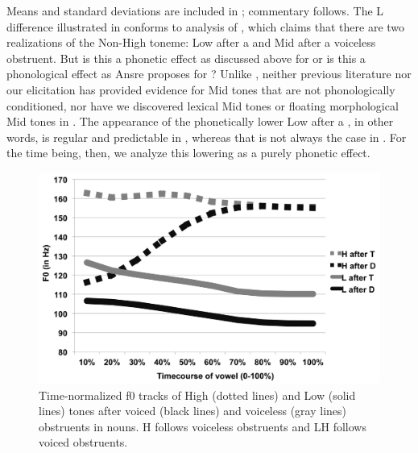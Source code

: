 \documentclass[output=paper,newtxmath,modfonts,nonflat,hidelinks]{langsci/langscibook}
\begin{document}
Means and standard deviations are included in ; commentary follows. The L  difference illustrated in  conforms to  analysis of , which claims that there are two realizations of the Non-High toneme: Low after a  and Mid after a voiceless obstruent. But is this a phonetic effect as discussed above for  \citep{Oglesbee2008} or is this a phonological effect as Ansre proposes for ? Unlike , neither previous  literature nor our elicitation has provided evidence for Mid tones that are not phonologically conditioned, nor have we discovered lexical Mid tones or floating morphological Mid tones in . The appearance of the phonetically lower Low after a , in other words, is regular and predictable in , whereas that is not always the case in . For the time being, then, we analyze this  lowering as a purely phonetic effect.


\begin{figure} 
	\includegraphics[width=\textwidth]{figures/fig-lotven-4.png}
	\caption{\label{fig:lotven:4} Time-normalized f0 tracks of High (dotted lines) and Low (solid lines) tones after voiced (black lines) and voiceless (gray lines) obstruents in nouns. H follows voiceless obstruents and LH follows voiced obstruents.}
\end{figure}
\end{document}
